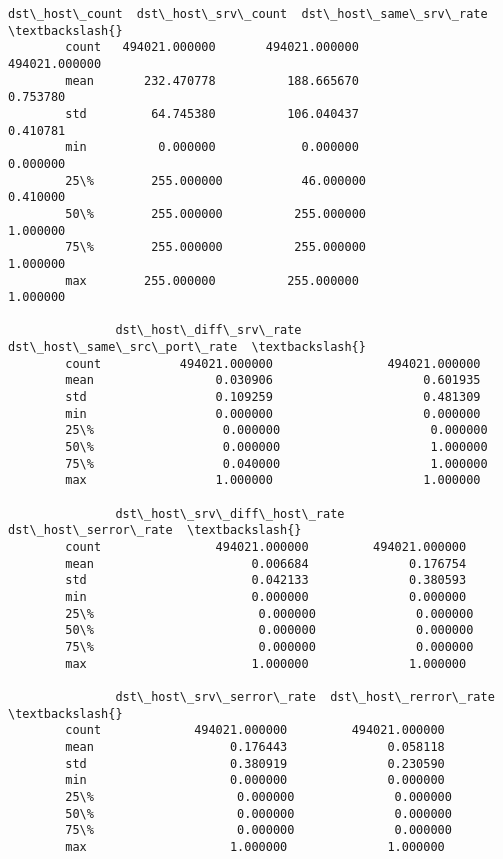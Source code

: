 \documentclass[11pt]{article}
\begin{document}
\begin{Verbatim}[commandchars=\\\{\}]
               dst\_host\_count  dst\_host\_srv\_count  dst\_host\_same\_srv\_rate  \textbackslash{}
        count   494021.000000       494021.000000           494021.000000   
        mean       232.470778          188.665670                0.753780   
        std         64.745380          106.040437                0.410781   
        min          0.000000            0.000000                0.000000   
        25\%        255.000000           46.000000                0.410000   
        50\%        255.000000          255.000000                1.000000   
        75\%        255.000000          255.000000                1.000000   
        max        255.000000          255.000000                1.000000   
        
               dst\_host\_diff\_srv\_rate  dst\_host\_same\_src\_port\_rate  \textbackslash{}
        count           494021.000000                494021.000000   
        mean                 0.030906                     0.601935   
        std                  0.109259                     0.481309   
        min                  0.000000                     0.000000   
        25\%                  0.000000                     0.000000   
        50\%                  0.000000                     1.000000   
        75\%                  0.040000                     1.000000   
        max                  1.000000                     1.000000   
        
               dst\_host\_srv\_diff\_host\_rate  dst\_host\_serror\_rate  \textbackslash{}
        count                494021.000000         494021.000000   
        mean                      0.006684              0.176754   
        std                       0.042133              0.380593   
        min                       0.000000              0.000000   
        25\%                       0.000000              0.000000   
        50\%                       0.000000              0.000000   
        75\%                       0.000000              0.000000   
        max                       1.000000              1.000000   
        
               dst\_host\_srv\_serror\_rate  dst\_host\_rerror\_rate  \textbackslash{}
        count             494021.000000         494021.000000   
        mean                   0.176443              0.058118   
        std                    0.380919              0.230590   
        min                    0.000000              0.000000   
        25\%                    0.000000              0.000000   
        50\%                    0.000000              0.000000   
        75\%                    0.000000              0.000000   
        max                    1.000000              1.000000   
        

\end{Verbatim}
\end{document}
